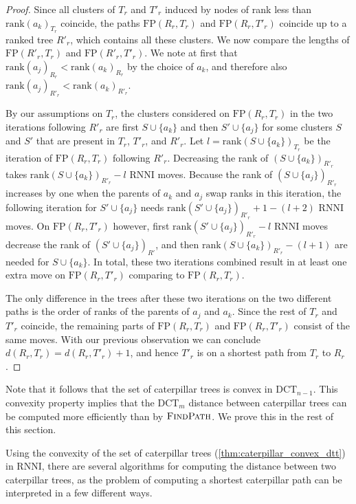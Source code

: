 \documentclass[11pt]{amsart}
\newcommand{\rnni}{\mathrm{RNNI}}
\newcommand{\findpath}{\textsc{FindPath}}
\newcommand{\rank}{\mathrm{rank}}
\newcommand{\fp}{\mathrm{FP}}
\newcommand{\dtt}{\mathrm{DCT}}
\newcommand{\summary}[1]{} %
\begin{document}
\begin{proof}
	Since all clusters of $T_r$ and $T'_r$ induced by nodes of rank less than $\rank(a_k)_{T_r}$ coincide, the paths $\fp(R_r,T_r)$ and $\fp(R_r,T'_r)$ coincide up to a ranked tree $R'_r$, which contains all these clusters.
	We now compare the lengths of $\fp(R'_r,T_r)$ and $\fp(R'_r,T'_r)$.
	We note at first that $\rank(a_j)_{R_r} < \rank(a_k)_{R_r}$ by the choice of $a_k$, and therefore also $\rank(a_j)_{R'_r} < \rank(a_k)_{R'_r}$.

	By our assumptions on $T_r$, the clusters considered on $\fp(R_r,T_r)$ in the two iterations following $R'_r$ are first $S \cup \{a_k\}$ and then $S' \cup \{a_j\}$ for some clusters $S$ and $S'$ that are present in $T_r$, $T'_r$, and $R'_r$.
	Let $l = \rank(S \cup \{a_k\})_{T_r}$ be the iteration of $\fp(R_r, T_r)$ following $R'_r$.
	Decreasing the rank of $(S \cup \{a_k\})_{R'_r}$ takes $\rank(S \cup \{a_k\})_{R'_r} - l$ $\rnni$ moves.
	Because the rank of $(S \cup \{a_j\})_{R'_r}$ increases by one when the parents of $a_k$ and $a_j$ swap ranks in this iteration, the following iteration for $S' \cup \{a_j\}$ needs $\rank(S' \cup \{a_j\})_{R'_r} + 1 - (l+2)$ $\rnni$ moves.
	On $\fp(R_r,T'_r)$ however, first $\rank(S' \cup \{a_j\})_{R'_r} - l$ $\rnni$ moves decrease the rank of $(S' \cup \{a_j\})_{R'}$, and then $\rank(S \cup \{a_k\})_{R'_r} - (l+1)$ are needed for $S \cup \{a_k\}$.
	In total, these two iterations combined result in at least one extra move on $\fp(R_r, T'_r)$ comparing to $\fp(R_r, T_r)$.

	The only difference in the trees after these two iterations on the two different paths is the order of ranks of the parents of $a_j$ and $a_k$.
	Since the rest of $T_r$ and $T'_r$ coincide, the remaining parts of $\fp(R_r, T_r)$ and $\fp(R_r, T'_r)$ consist of the same moves.
	With our previous observation we can conclude $d(R_r,T_r) = d(R_r,T'_r) + 1$, and hence $T'_r$ is on a shortest path from $T_r$ to $R_r$.
\end{proof}

Note that it follows that the  set of caterpillar trees is convex in $\dtt_{n-1}$.
This convexity property implies that the $\dtt_m$ distance between caterpillar trees can be computed more efficiently than by $\findpath$.
We prove this in the rest of this section.

\summary{With \autoref{thm:caterpillar_convex_dtt} we can find a more efficient way to compute distances between caterpillar trees.}
Using the convexity of the set of caterpillar trees (\autoref{thm:caterpillar_convex_dtt}) in $\rnni$, there are several algorithms for computing the distance between two caterpillar trees, as the problem of computing a shortest caterpillar path can be interpreted in a few different ways.
\end{document}
